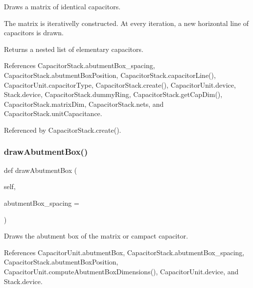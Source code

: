 Draws a matrix of identical capacitors. 

The matrix is iterativelly constructed. At every iteration, a new horizontal line of capacitors is drawn. \begin{DoxyReturn}{Returns}
a nested list of elementary capacitors. 
\end{DoxyReturn}


References Capacitor\+Stack.\+abutment\+Box\+\_\+spacing, Capacitor\+Stack.\+abutment\+Box\+Position, Capacitor\+Stack.\+capacitor\+Line(), Capacitor\+Unit.\+capacitor\+Type, Capacitor\+Stack.\+create(), Capacitor\+Unit.\+device, Stack.\+device, Capacitor\+Stack.\+dummy\+Ring, Capacitor\+Stack.\+get\+Cap\+Dim(), Capacitor\+Stack.\+matrix\+Dim, Capacitor\+Stack.\+nets, and Capacitor\+Stack.\+unit\+Capacitance.



Referenced by Capacitor\+Stack.\+create().

\mbox{\label{classpython_1_1capacitormatrix_1_1CapacitorStack_a8ff901c4f22ccba4e7fc19f9ce98109e}} 
\subsubsection{\texorpdfstring{draw\+Abutment\+Box()}{drawAbutmentBox()}}
{\footnotesize\ttfamily def draw\+Abutment\+Box (\begin{DoxyParamCaption}\item[{}]{self,  }\item[{}]{abutment\+Box\+\_\+spacing = {} }\end{DoxyParamCaption})}



Draws the abutment box of the matrix or campact capacitor. 



References Capacitor\+Unit.\+abutment\+Box, Capacitor\+Stack.\+abutment\+Box\+\_\+spacing, Capacitor\+Stack.\+abutment\+Box\+Position, Capacitor\+Unit.\+compute\+Abutment\+Box\+Dimensions(), Capacitor\+Unit.\+device, and Stack.\+device.

\mbox{\label{classpython_1_1capacitormatrix_1_1CapacitorStack_afd56ae8981043c8ef680d0c7ac0a3acb}} 
